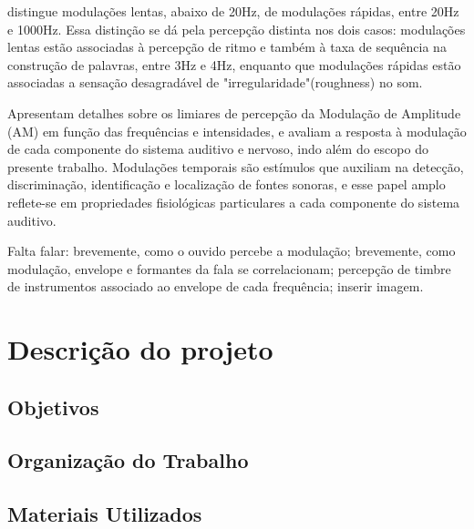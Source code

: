 \citet{langner1992} distingue modulações lentas, abaixo de 20Hz, de
modulações rápidas, entre 20Hz e 1000Hz. Essa distinção se dá pela percepção
distinta nos dois casos: modulações lentas estão associadas à percepção de
ritmo e também à taxa de sequência na construção de palavras, entre 3Hz e 4Hz,
enquanto que modulações rápidas estão associadas a sensação desagradável
de "irregularidade"(roughness) no som. 

\citet{zwicker2013} Apresentam detalhes sobre os limiares de percepção da
Modulação de Amplitude (AM) em função das frequências e intensidades, \citet{joris2004} e
\citet{langner1992} avaliam a resposta à modulação de cada componente do 
sistema auditivo e nervoso, indo além do escopo do
presente trabalho. Modulações temporais são estímulos que auxiliam na detecção,
discriminação, identificação e localização de fontes sonoras,
e esse papel amplo reflete-se em propriedades fisiológicas particulares a cada
componente do sistema auditivo. 

Falta falar: brevemente, como o ouvido percebe a modulação; brevemente, como modulação,
 envelope e formantes da fala se correlacionam; percepção de timbre de instrumentos
  associado ao envelope de cada frequência; inserir imagem.

\section{Descrição do projeto}
\subsection{Objetivos}
\subsection{Organização do Trabalho}
\subsection{Materiais Utilizados}
